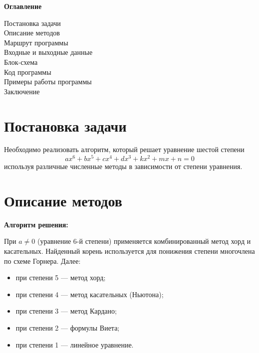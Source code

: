 \documentclass[a4paper,14pt]{extarticle}
\begin{document}
\vspace{1em}
\noindent\textbf{Оглавление}
\vspace{0.5em}

\noindent\noindent\hspace{\parindent}Постановка задачи \dotfill\ \pageref{sec:problem}\\
\hspace{\parindent}Описание методов \dotfill\ \pageref{sec:methods}\\
\hspace{\parindent}Маршрут программы \dotfill\ \pageref{sec:route}\\
\hspace{\parindent}Входные и выходные данные \dotfill\ \pageref{sec:variables}\\
\hspace{\parindent}Блок-схема \dotfill\ \pageref{sec:flowchart}\\
\hspace{\parindent}Код программы \dotfill\ \pageref{sec:code}\\
\hspace{\parindent}Примеры работы программы \dotfill\ \pageref{sec:tests}\\
\hspace{\parindent}Заключение \dotfill\ \pageref{sec:conclusion}

\newpage
\section*{Постановка задачи}
\label{sec:problem}

Необходимо реализовать алгоритм, который решает уравнение шестой степени
\[
ax^6 + bx^5 + cx^4 + dx^3 + kx^2 + mx + n = 0
\]
используя различные численные методы в зависимости от степени уравнения.

\section*{Описание методов}
\label{sec:methods}

\textbf{Алгоритм решения:}

При \( a \neq 0 \) (уравнение 6-й степени) применяется комбинированный метод хорд и касательных. Найденный корень используется для понижения степени многочлена по схеме Горнера. Далее:
\begin{itemize}
  \item при степени 5 --- метод хорд;
  \item при степени 4 --- метод касательных (Ньютона);
  \item при степени 3 --- метод Кардано;
  \item при степени 2 --- формулы Виета;
  \item при степени 1 --- линейное уравнение.
\end{itemize}
\end{document}
